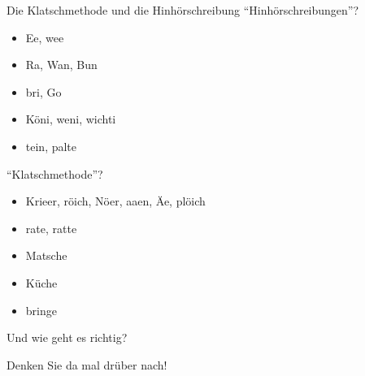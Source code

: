 \begin{frame}
  {Die Klatschmethode und die Hinhörschreibung}
  \pause
  "`Hinhörschreibungen"'?\\
  \begin{itemize}[<+->]
    \item Ee, wee
    \item Ra, Wan, Bun
    \item bri, Go
    \item Köni, weni, wichti
    \item {}tein, palte
  \end{itemize}
  \pause
  "`Klatschmethode"'?\\
  \begin{itemize}[<+->]
    \item Krieer, röich, Nöer, aaen, Äe, plöich
    \item rate, ratte
    \item Matsche
    \item Küche
    \item bringe
  \end{itemize}
\end{frame}


\begin{frame}
  {Und wie geht es richtig?}
  \pause
  \Large
  \Zeile\Zeile
  \begin{center}
    Denken Sie da mal drüber nach!
  \end{center}
\end{frame}

